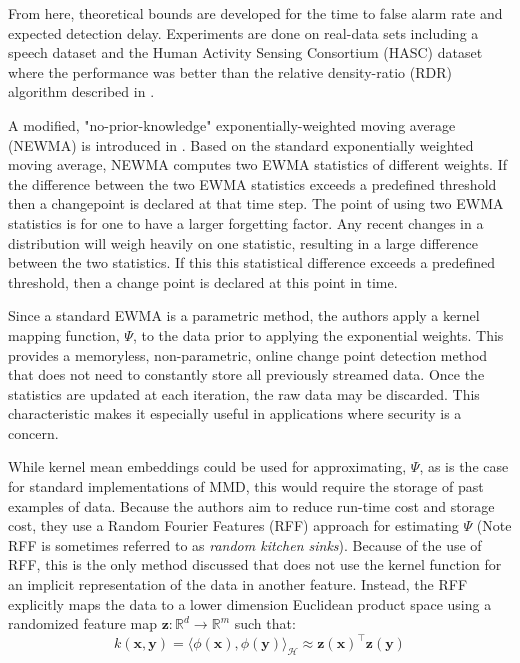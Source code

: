 From here, theoretical bounds are developed for the time to false alarm rate and expected detection delay. Experiments are done on real-data sets including a speech dataset  and the Human Activity Sensing Consortium (HASC) dataset where the performance was better than the relative density-ratio (RDR) algorithm described in \cite{liu2013change}.


A modified, "no-prior-knowledge" exponentially-weighted moving average (NEWMA) is introduced in \cite{keriven2018newma}. Based on the standard exponentially weighted moving average, NEWMA computes two EWMA statistics of different weights. If the difference between the two EWMA statistics exceeds a predefined threshold then a changepoint is declared at that time step. The point of using two EWMA statistics is for one to have a larger forgetting factor. Any recent changes in a distribution will weigh heavily on one statistic, resulting in a large difference between the two statistics. If this this statistical difference exceeds a predefined threshold, then a change point is declared at this point in time.

Since a standard EWMA is a parametric method, the authors apply a kernel mapping function, $\Psi$, to the data prior to applying the exponential weights. This provides a memoryless, non-parametric, online change point detection method that does not need to constantly store all previously streamed data. Once the statistics are updated at each iteration, the raw data may be discarded. This characteristic makes it especially useful in applications where security is a concern.

While kernel mean embeddings could be used for approximating, $\Psi$, as is the case for standard implementations of MMD, this would require the storage of past examples of data. Because the authors aim to reduce run-time cost and storage cost, they use a Random Fourier Features (RFF) approach for estimating $\Psi$ (Note RFF is sometimes referred to as \textit{random kitchen sinks}). Because of the use of RFF, this is the only method discussed that does not use the kernel function for an implicit representation of the data in another feature. Instead, the RFF explicitly maps the data to a lower dimension Euclidean product space using a randomized feature map $\mathbf{z}: \mathbb{R}^d \rightarrow \mathbb{R}^m$ such that:
\begin{equation}
k(\mathbf{x}, \mathbf{y})=\langle\phi(\mathbf{x}), \phi(\mathbf{y})\rangle_{\mathcal{H}} \approx \mathbf{z}(\mathbf{x})^{\top} \mathbf{z}(\mathbf{y})
\end{equation}

